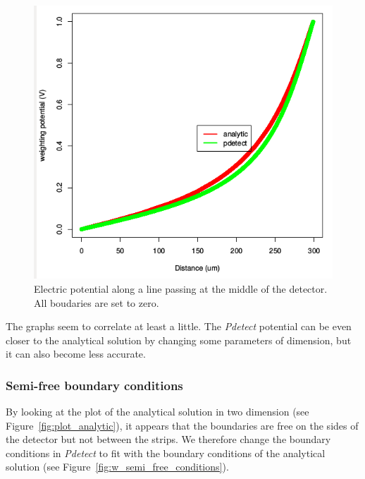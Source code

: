 \documentclass[11pt]{article}
\begin{document}
			\begin{figure}[H]
				\center
				\includegraphics[scale=0.5]{images/boundary_conditions/zero_conditions.png}
				\caption{Electric potential along a line passing at the middle of the detector.
						All boudaries are set to zero.}
				\label{fig:zero_conditions}
			\end{figure}
\newpage
			The graphs seem to correlate at least a little. The \textit{Pdetect} potential can
			be even closer to the analytical solution by changing some parameters of dimension,
			but it can also become less accurate.

		\subsubsection{Semi-free boundary conditions}

			By looking at the plot of the analytical solution in two dimension
			(see Figure~\ref{fig:plot_analytic}), it appears that the boundaries are
			free on the sides of the detector but not between the strips. We therefore change
			the boundary conditions in \textit{Pdetect} to fit with the boundary conditions of
			the analytical solution (see Figure~\ref{fig:w_semi_free_conditions}).
\end{document}
